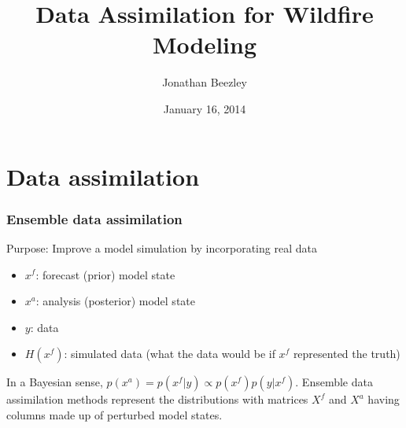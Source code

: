 \documentclass{beamer}
\title
{Data Assimilation for Wildfire Modeling}
\author %
{Jonathan Beezley}
\institute[CERFACS] %
\date %
{January 16, 2014}
\begin{document}
\begin{frame}
  \titlepage
\end{frame}


\section{Data assimilation}

\begin{frame}
\frametitle{Ensemble data assimilation}
Purpose: Improve a model simulation by incorporating real data%
\begin{itemize}
\item
 $x^f$: forecast (prior) model state
\item
 $x^a$: analysis (posterior) model state
 \item
  $y$: data
 \item
  $H(x^f)$: simulated data (what the data would be if $x^f$ represented the truth)
\end{itemize}
In a Bayesian sense, $p(x^a)=p(x^f|y)\propto p(x^f)p(y|x^f)$.
Ensemble data assimilation methods represent the distributions with matrices 
$X^f$ and $X^a$ having columns made up of perturbed model states.
\end{frame}


\end{document}
